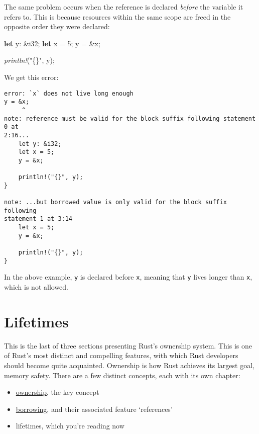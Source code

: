 \documentclass[a4paper,]{book}
\newenvironment{Shaded}{\begin{snugshade}}{\end{snugshade}}
\newcommand{\KeywordTok}[1]{\textcolor[rgb]{0.13,0.29,0.53}{\textbf{{#1}}}}
\newcommand{\DataTypeTok}[1]{\textcolor[rgb]{0.13,0.29,0.53}{{#1}}}
\newcommand{\DecValTok}[1]{\textcolor[rgb]{0.00,0.00,0.81}{{#1}}}
\newcommand{\StringTok}[1]{\textcolor[rgb]{0.31,0.60,0.02}{{#1}}}
\newcommand{\PreprocessorTok}[1]{\textcolor[rgb]{0.56,0.35,0.01}{\textit{{#1}}}}
\newcommand{\NormalTok}[1]{{#1}}
\providecommand{\tightlist}{%
  \setlength{\itemsep}{0pt}\setlength{\parskip}{0pt}}
\begin{document}
The same problem occurs when the reference is declared \emph{before} the
variable it refers to. This is because resources within the same scope
are freed in the opposite order they were declared:

\begin{Shaded}
\begin{Highlighting}[]
\KeywordTok{let} \NormalTok{y: &}\DataTypeTok{i32}\NormalTok{;}
\KeywordTok{let} \NormalTok{x = }\DecValTok{5}\NormalTok{;}
\NormalTok{y = &x;}

\PreprocessorTok{println!}\NormalTok{(}\StringTok{"\{\}"}\NormalTok{, y);}
\end{Highlighting}
\end{Shaded}

We get this error:

\begin{verbatim}
error: `x` does not live long enough
y = &x;
     ^
note: reference must be valid for the block suffix following statement 0 at
2:16...
    let y: &i32;
    let x = 5;
    y = &x;

    println!("{}", y);
}

note: ...but borrowed value is only valid for the block suffix following
statement 1 at 3:14
    let x = 5;
    y = &x;

    println!("{}", y);
}
\end{verbatim}

In the above example, \texttt{y} is declared before \texttt{x}, meaning
that \texttt{y} lives longer than \texttt{x}, which is not allowed.

\hypertarget{sec--lifetimes}{\section{Lifetimes}\label{sec--lifetimes}}

This is the last of three sections presenting Rust's ownership system.
This is one of Rust's most distinct and compelling features, with which
Rust developers should become quite acquainted. Ownership is how Rust
achieves its largest goal, memory safety. There are a few distinct
concepts, each with its own chapter:

\begin{itemize}
\tightlist
\item
  \protect\hyperlink{sec--ownership}{ownership}, the key concept
\item
  \protect\hyperlink{sec--references-and-borrowing}{borrowing}, and
  their associated feature `references'
\item
  lifetimes, which you're reading now
\end{itemize}
\end{document}
